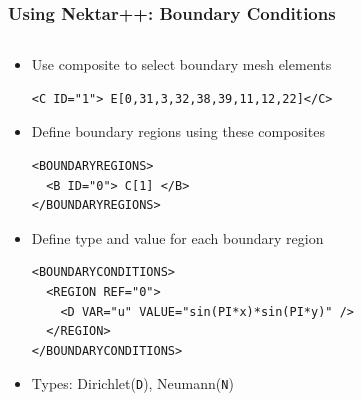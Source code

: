 \documentclass{beamer}
\numberwithin{figure}{section}
\numberwithin{equation}{section}
\begin{document}
\begin{frame}[fragile]
\frametitle{Using Nektar++: Boundary Conditions}
\begin{minipage}[c][0.8\textheight][t]{\linewidth}
\begin{columns}
\begin{column}[l]{11.5cm}
\begin{itemize}
  \item Use composite to select boundary mesh elements
  \begin{lstlisting}
<C ID="1"> E[0,31,3,32,38,39,11,12,22]</C>
  \end{lstlisting}
  \item Define boundary regions using these composites
  \begin{lstlisting}
<BOUNDARYREGIONS>
  <B ID="0"> C[1] </B>
</BOUNDARYREGIONS>
  \end{lstlisting}
  \item Define type and value for each boundary region
  \begin{lstlisting}
<BOUNDARYCONDITIONS>
  <REGION REF="0">
    <D VAR="u" VALUE="sin(PI*x)*sin(PI*y)" />
  </REGION>
</BOUNDARYCONDITIONS>
  \end{lstlisting}
  \item Types: Dirichlet(\texttt{D}), Neumann(\texttt{N})
\end{itemize}
\end{column}
\end{columns}
\end{minipage}
\end{frame}


\end{document}
